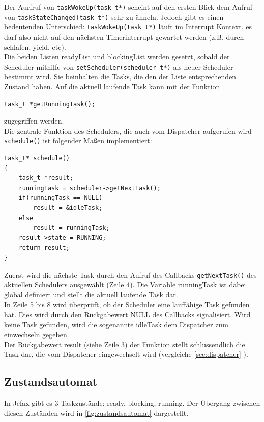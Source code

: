 \documentclass[fontsize=12pt, toc=bibliography, notitlepage]{scrreprt}
\newcommand{\refnn}[1]{\ref{#1} \nameref{#1}}
\begin{document}
Der Aurfruf von \lstinline$taskWokeUp(task_t*)$ scheint auf den ersten Blick dem Aufruf von \lstinline$taskStateChanged(task_t*)$ sehr zu ähneln. Jedoch gibt es einen bedeutenden Unterschied: \lstinline$taskWokeUp(task_t*)$ läuft im Interrupt Kontext, es darf also nicht auf den nächsten Timerinterrupt gewartet werden (z.B. durch schlafen, yield, etc).\\

Die beiden Listen readyList und blockingList werden gesetzt, sobald der Scheduler mithilfe von \lstinline$setScheduler(scheduler_t*)$ als neuer Scheduler bestimmt wird. Sie beinhalten die Tasks, die den der Liste entsprechenden Zustand haben. Auf die aktuell laufende Task kann mit der Funktion

\begin{lstlisting}
task_t *getRunningTask();
\end{lstlisting}

zugegriffen werden.\\

Die zentrale Funktion des Schedulers, die auch vom Dispatcher aufgerufen wird \lstinline$schedule()$ ist folgender Maßen implementiert:

\begin{lstlisting}[title=scheduler.c]
task_t* schedule()
{
	task_t *result;
	runningTask = scheduler->getNextTask();
	if(runningTask == NULL)
		result = &idleTask;
	else
		result = runningTask;
	result->state = RUNNING;
	return result;
}
\end{lstlisting}

Zuerst wird die nächste Task durch den Aufruf des Callbacks \lstinline$getNextTask()$ des aktuellen Schedulers ausgewählt (Zeile 4). Die Variable runningTask ist dabei global definiert und stellt die aktuell laufende Task dar.\\

In Zeile 5 bis 8 wird überprüft, ob der Scheduler eine lauffähige Task gefunden hat. Dies wird durch den Rückgabewert NULL des Callbacks signalisiert. Wird keine Task gefunden, wird die sogenannte idleTask dem Dispatcher zum einwechseln gegeben.\\

Der Rückgabewert result (siehe Zeile 3) der Funktion stellt schlussendlich die Task dar, die vom Dispatcher eingewechselt wird (vergleiche \refnn{sec:dispatcher}).

\subsection{Zustandsautomat}
\label{subsec:zustandsautomat}
In Jefax gibt es 3 Taskzustände: ready, blocking, running. Der Übergang zwischen diesen Zuständen wird in \autoref{fig:zustandsautomat} dargestellt.
\end{document}
